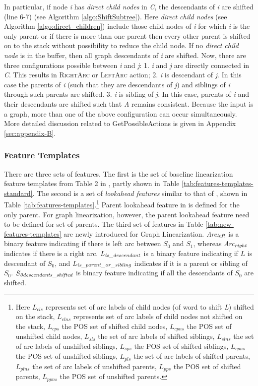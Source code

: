 \documentclass[11pt]{article}
\begin{document}
In particular, if node {\it i} has {\it direct child nodes} in {\it C}, the descendants of {\it i} are shifted (line 6-7) (see Algorithm \ref{algo:ShiftSubtree}). Here {\it direct child nodes} (see Algorithm \ref{algo:direct_children}) include those child nodes of {\it i} for which {\it i} is the only parent or if there is more than one parent then every other parent is shifted on to the stack without possibility to reduce the child node. If no {\it direct child node} is in the buffer, then all graph descendants of {\it i} are shifted. Now, there are three configurations possible between {\it i} and {\it j}: 1. {\it i} and {\it j} are directly connected in {\it C}. This results in \textsc{RightArc} or \textsc{LeftArc} action; 2. {\it i} is descendant of {\it j}. In this case the parents of {\it i} (such that they are descendants of {\it j}) and siblings of {\it i} through such parents are shifted. 3. {\it i} is sibling of {\it j}. In this case, parents of {\it i} and their descendants are shifted such that {\it A} remains consistent. Because the input is a graph, more than one of the above configuration can occur simultaneously. More detailed discussion related to {\sc GetPossibleActions} is given in Appendix \ref{sec:appendix-B}. 



\subsubsection{Feature Templates}
There are three sets of features. The first is the set of baseline linearization feature templates from Table 2 in , partly shown in Table \ref{tab:features-templates-standard}. The second is a set of {\it lookahead features} similar to that of , shown in Table  \ref{tab:features-templates}.\footnote{Here $L_{cls}$ represents set of arc labels of child nodes (of word to shift {\it L}) shifted on the stack, $L_{clns}$ represents set of arc labels of child nodes not shifted on the stack, $L_{cps}$ the POS set of shifted child nodes, $L_{cpns}$ the POS set of unshifted child nodes, $L_{sls}$ the set of arc labels of shifted siblings, $L_{slns}$ the set of arc labels of unshifted siblings, $L_{sps}$ the POS set of shifted siblings, $L_{cpns}$ the POS set of unshifted siblings, $L_{pls}$ the set of arc labels of shifted parents, $L_{plns}$ the set of arc labels of unshifted parents, $L_{pps}$ the POS set of shifted parents, $L_{ppns}$ the POS set of unshifted parents.} Parent lookahead feature in  is defined for the only parent. For graph linearization, however, the parent lookahead feature need to be defined for set of parents. The third set of features in Table \ref{tab:new-features-templates} are newly introduced for Graph Linearization. {\it Arc$_{\it left}$} is a binary feature indicating if there is left arc between $S_0$ and $S_1$, whereas {\it Arc$_{\it right}$} indicates if there is a right arc.  {\it L$_{\it is\_descendant}$} is a binary feature indicating if $L$ is descendant of $S_0$, and {\it L$_{\it is\_parent\_or\_sibling}$} indicates if it is a parent or sibling of $S_0$. {\it $S_{\it 0descendants\_shifted}$} is binary feature indicating if all the descendants of $S_0$ are shifted. 
\end{document}
